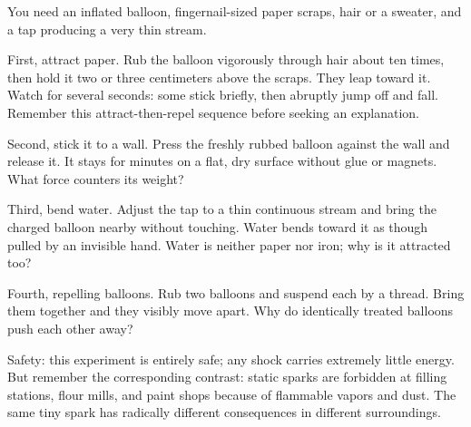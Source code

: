 
\begin{experiment}
You need an inflated balloon, fingernail-sized paper scraps, hair or a sweater, and a tap producing a very thin stream.

First, attract paper. Rub the balloon vigorously through hair about ten times, then hold it two or three centimeters above the scraps. They leap toward it. Watch for several seconds: some stick briefly, then abruptly jump off and fall. Remember this attract-then-repel sequence before seeking an explanation.

Second, stick it to a wall. Press the freshly rubbed balloon against the wall and release it. It stays for minutes on a flat, dry surface without glue or magnets. What force counters its weight?

Third, bend water. Adjust the tap to a thin continuous stream and bring the charged balloon nearby without touching. Water bends toward it as though pulled by an invisible hand. Water is neither paper nor iron; why is it attracted too?

Fourth, repelling balloons. Rub two balloons and suspend each by a thread. Bring them together and they visibly move apart. Why do identically treated balloons push each other away?

Safety: this experiment is entirely safe; any shock carries extremely little energy. But remember the corresponding contrast: static sparks are forbidden at filling stations, flour mills, and paint shops because of flammable vapors and dust. The same tiny spark has radically different consequences in different surroundings.
\end{experiment}


